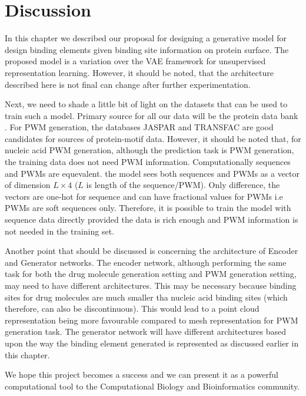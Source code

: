 \section{Discussion}
In this chapter we described our proposal for designing a generative model for design binding
elements given binding site information on protein surface. The proposed model is a variation over the VAE
framework \citep{Kingma2014} for unsupervised representation learning. However, it should be noted,
that the architecture described here is not final can change after further experimentation.

Next, we need to shade a little bit of light on the datasets that can be used to train such a model.
Primary source for all our data will be the protein data bank \citep{berman2000protein}. For PWM
generation, the databases JASPAR \citep{fornes2020jaspar} and TRANSFAC \citep{wingender2008transfac}
are good candidates for sources of protein-motif data. However, it should
be noted that, for nucleic acid PWM generation, although the prediction task is PWM generation, the
training data does not need PWM information. Computationally sequences and PWMs are equevalent. the model
sees both sequences and PWMs as a vector of dimension $L \times 4$ ($L$ is length of the
sequence/PWM). Only difference, the vectors are one-hot for sequence and can have fractional values
for PWMs i.e PWMs are soft sequences only. Therefore, it is possible to train the model with
sequence data directly provided the data is rich enough and PWM information is not needed in the
training set. 

Another point that should be discussed is concerning the architecture of Encoder and Generator
networks. The encoder network, although performing the same task for both the drug molecule
generation setting and PWM generation setting, may need to have different architectures. This may be necessary because binding sites for drug molecules are much smaller tha
nucleic acid binding sites (which therefore, can also be discontinuous). This would lead to a point
cloud representation being more favourable compared to mesh representation for PWM generation task.
The generator network will have different architectures based upon the way the binding element
generated is represented as discussed earlier in this chapter.

We hope this project becomes a success and we can present it as a powerful computational tool to the
Computational Biology and Bioinformatics community.

